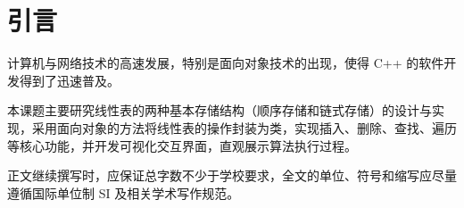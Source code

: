 \chapter{引言}

计算机与网络技术的高速发展，特别是面向对象技术的出现，使得 C++ 的软件开发得到了迅速普及。

本课题主要研究线性表的两种基本存储结构（顺序存储和链式存储）的设计与实现，采用面向对象的方法将线性表的操作封装为类，实现插入、删除、查找、遍历等核心功能，并开发可视化交互界面，直观展示算法执行过程。

正文继续撰写时，应保证总字数不少于学校要求，全文的单位、符号和缩写应尽量遵循国际单位制 SI 及相关学术写作规范。
